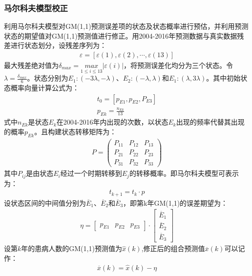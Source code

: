 \documentclass{whutmod}
\begin{document}
	     \subsubsection{马尔科夫模型校正}
	     利用马尔科夫模型对GM(1,1)预测误差项的状态及状态概率进行预估，并利用预测状态的期望值对GM(1,1)预测值进行修正。用2004-2016年预测数据与真实数据残差进行状态划分，设残差序列为：
	     \begin{gather}
	    \varepsilon =[\varepsilon(1) ,\varepsilon(2), \cdots,\varepsilon(13)]
	     \end{gather}
	    最大残差绝对值为$\delta _{max}=\underset{1\leqslant i\leqslant13 }{max}\left | \varepsilon(i) \right |$，将预测误差化均分为三个状态。令$\lambda =\frac{\delta _{max}}{6}$。状态分别为$E_{1}:(-3\lambda,-\lambda)$、$E_{2}:(-\lambda,\lambda)$和$E_{1}:(\lambda,3\lambda)$。其中初始状态概率向量计算公式为：
	   \begin{gather}
	 t_{0}=[p_{E1},p_{E2},P_{E3}]\\
	 p_{Ek}=\frac{n_{Ek}}{13}
	  \end{gather}
	  式中$n_{Ek}$是状态$E_{k}$在2004-2016年内出现的次数，以状态$E_{k}$出现的频率代替其出现的概率$p_{Ek}$。且构建状态转移矩阵为：
	   \begin{gather}
	  P=\left(\begin{array}{lll}{P_{11}} & {P_{12}} & {P_{13}} \\ {P_{21}} & {P_{22}} & {P_{23}} \\ {P_{31}} & {P_{32}} & {P_{33}}\end{array}\right)
	  \end{gather}
	  其中$P_{ij}$是由状态$E_{i}$经过一个时期转移到$E_{j}$的转移概率。即马尔科夫模型可表示为：	  
	   \begin{gather}
	   t_{k+1}=t_{k} \cdot p
	  \end{gather}
	  设状态区间的中间值分别为$\overline{E}_{1}$、$\overline{E}_{2}$和$\overline{E}_{3}$，即第k年GM(1,1)的误差期望为：
	   \begin{gather}
\eta =\begin{bmatrix}
p_{E1} & p_{E2} & p_{E3}
\end{bmatrix} \cdot\begin{bmatrix}
\overline{E}_{1}\\ 
\overline{E}_{2}\\ 
\overline{E}_{3}
\end{bmatrix}
	  \end{gather}
	  设第$k$年的患病人数的GM(1,1)预测值为$\widehat{x}(k)$,修正后的组合预测值$\overline{x}(k)$可以记作：
	     \begin{gather}
	     \overline{x}(k) =\widehat{x}(k)-\eta
	   \end{gather}
	
\end{document}
